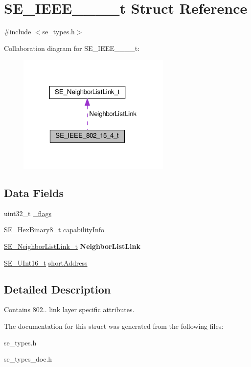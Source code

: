 \hypertarget{structSE__IEEE__802__15__4__t}{}\section{S\+E\+\_\+\+I\+E\+E\+E\+\_\+\_\+\_\+\_\+t Struct Reference}
\label{structSE__IEEE__802__15__4__t}


{\ttfamily \#include $<$se\+\_\+types.\+h$>$}



Collaboration diagram for S\+E\+\_\+\+I\+E\+E\+E\+\_\+\_\+\_\+\_\+t\+:\nopagebreak
\begin{figure}[H]
\begin{center}
\leavevmode
\includegraphics[width=214pt]{structSE__IEEE__802__15__4__t__coll__graph}
\end{center}
\end{figure}
\subsection*{Data Fields}
\begin{DoxyCompactItemize}
\item 
uint32\+\_\+t \hyperlink{group__IEEE__802__15__4_ga70921a1684123e1205ce217e660f59a1}{\+\_\+flags}
\item 
\hyperlink{group__HexBinary8_gaecf2dab3615fb954a693c017a61f77d6}{S\+E\+\_\+\+Hex\+Binary8\+\_\+t} \hyperlink{group__IEEE__802__15__4_ga1a4b7766899d73e6a3202c95eb813123}{capability\+Info}
\item 
\hyperlink{structSE__NeighborListLink__t}{S\+E\+\_\+\+Neighbor\+List\+Link\+\_\+t} {\bfseries Neighbor\+List\+Link}
\item 
\hyperlink{group__UInt16_gac68d541f189538bfd30cfaa712d20d29}{S\+E\+\_\+\+U\+Int16\+\_\+t} \hyperlink{group__IEEE__802__15__4_gab2e418772d2677aa0c54140a3f460947}{short\+Address}
\end{DoxyCompactItemize}


\subsection{Detailed Description}
Contains 802.. link layer specific attributes. 

The documentation for this struct was generated from the following files\+:\begin{DoxyCompactItemize}
\item 
se\+\_\+types.\+h\item 
se\+\_\+types\+\_\+doc.\+h\end{DoxyCompactItemize}

